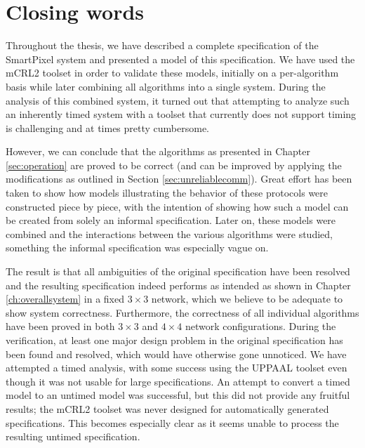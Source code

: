 \chapter{Closing words}

Throughout the thesis, we have described a complete specification of the SmartPixel system and presented a model of this specification. We have used the mCRL2 toolset in order to validate these models, initially on a per-algorithm basis while later combining all algorithms into a single system. During the analysis of this combined system, it turned out that attempting to analyze such an inherently timed system with a toolset that currently does not support timing is challenging and at times pretty cumbersome.

However, we can conclude that the algorithms as presented in Chapter \ref{sec:operation} are proved to be correct (and can be improved by applying the modifications as outlined in Section \ref{sec:unreliablecomm}). Great effort has been taken to show how models illustrating the behavior of these protocols were constructed piece by piece, with the intention of showing how such a model can be created from solely an informal specification. Later on, these models were combined and the interactions between the various algorithms were studied, something the informal specification was especially vague on.

The result is that all ambiguities of the original specification have been resolved and the resulting specification indeed performs as intended as shown in Chapter \ref{ch:overallsystem} in a fixed $3 \times 3$ network, which we believe to be adequate to show system correctness. Furthermore, the correctness of all individual algorithms have been proved in both $3 \times 3$ and $4 \times 4$ network configurations. During the verification, at least one major design problem in the original specification has been found and resolved, which would have otherwise gone unnoticed. We have attempted a timed analysis, with some success using the UPPAAL toolset even though it was not usable for large specifications. An attempt to convert a timed model to an untimed model was successful, but this did not provide any fruitful results; the mCRL2 toolset was never designed for automatically generated specifications. This becomes especially clear as it seems unable to process the resulting untimed specification.

